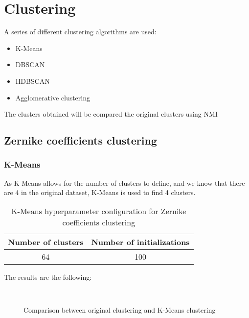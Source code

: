 \section{Clustering}
	
		
		A series of different clustering algorithms are used:
		\begin{itemize}
			\item K-Means
			\item DBSCAN
			\item HDBSCAN
			\item Agglomerative clustering
		\end{itemize}
		
		The clusters obtained will be compared the original clusters using NMI
		
	\subsection{Zernike coefficients clustering}
		
		\subsubsection{K-Means}
			
			As K-Means allows for the number of clusters to define, and we know that there are 4 in the original dataset, K-Means is used to find 4 clusters.
			
			\begin{table}[h!]
				\centering
				\begin{tabular}{|c|c|}
					\hline
					\textbf{Number of clusters} & \textbf{Number of initializations}\\
					\hline
					64 & 100\\
					\hline
				\end{tabular}
				\caption{K-Means hyperparameter configuration for Zernike coefficients clustering}
			\end{table}
		
			The results are the following:
			
			\begin{figure*}[ht!]
				\centering
				\hspace{\fill}
				\\
					
				\hspace{\fill}
				\caption{Comparison between original clustering and K-Means clustering}
			\end{figure*}
		\FloatBarrier
		
